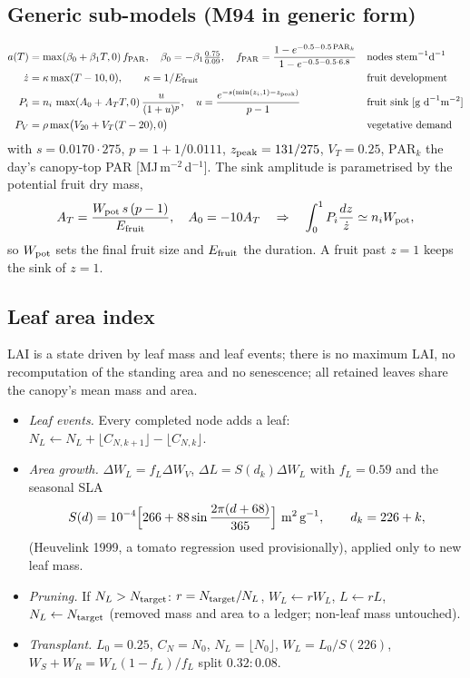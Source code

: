 \documentclass[11pt,a4paper]{article}
\begin{document}
\subsection{Generic sub-models (M94 in generic form)}
\begin{align}
a(T)&=\max(\beta_0+\beta_1T,0)\,f_{\rm PAR},\quad \beta_0=-\beta_1\tfrac{0.75}{0.09},\quad
f_{\rm PAR}=\frac{1-e^{-0.5-0.5\,\mathrm{PAR}_k}}{1-e^{-0.5-0.5\cdot6.8}} &&\text{nodes stem}^{-1}\text{d}^{-1}\\
\dot z&=\kappa\max(T-10,0),\qquad \kappa=1/E_{\rm fruit} &&\text{fruit development}\\
P_i&=n_i\,\max(A_0+A_TT,0)\,\frac{u}{(1+u)^p},\quad u=\frac{e^{-s(\min(z_i,1)-z_{\rm peak})}}{p-1} &&\text{fruit sink [g d}^{-1}\text{m}^{-2}]\\
P_V&=\rho\max\bigl(V_{20}+V_T(T-20),0\bigr) &&\text{vegetative demand}
\end{align}
with $s=0.0170\cdot275$, $p=1+1/0.0111$, $z_{\rm peak}=131/275$, $V_T=0.25$, $\mathrm{PAR}_k$ the day's canopy-top PAR
[MJ\,m$^{-2}$\,d$^{-1}$]. The sink amplitude is parametrised by the potential fruit dry mass,
\begin{equation}
A_T=\frac{W_{\rm pot}\,s\,(p-1)}{E_{\rm fruit}},\quad A_0=-10A_T\quad\Rightarrow\quad\int_0^1P_i\frac{dz}{\dot z}\simeq n_iW_{\rm pot},
\end{equation}
so $W_{\rm pot}$ sets the final fruit size and $E_{\rm fruit}$ the duration. A fruit past $z=1$ keeps the sink of $z=1$.

\subsection{Leaf area index}\label{sec:lai}
LAI is a state driven by leaf mass and leaf events; there is no maximum LAI, no recomputation of the standing area and no
senescence; all retained leaves share the canopy's mean mass and area.
\begin{itemize}[nosep]
\item \emph{Leaf events.} Every completed node adds a leaf: $N_L\leftarrow N_L+\lfloor C_{N,k+1}\rfloor-\lfloor C_{N,k}\rfloor$.
\item \emph{Area growth.} $\Delta W_L=f_L\Delta W_V$, $\Delta L=S(d_k)\Delta W_L$ with $f_L=0.59$ and the seasonal SLA
\begin{equation}
S(d)=10^{-4}\Bigl[266+88\sin\frac{2\pi(d+68)}{365}\Bigr]\ \text{m}^2\,\text{g}^{-1},\qquad d_k=226+k,
\end{equation}
(Heuvelink 1999, a tomato regression used provisionally), applied only to new leaf mass.
\item \emph{Pruning.} If $N_L>N_{\rm target}$: $r=N_{\rm target}/N_L$, $W_L\leftarrow rW_L$, $L\leftarrow rL$,
$N_L\leftarrow N_{\rm target}$ (removed mass and area to a ledger; non-leaf mass untouched).
\item \emph{Transplant.} $L_0=0.25$, $C_N=N_0$, $N_L=\lfloor N_0\rfloor$, $W_L=L_0/S(226)$, $W_S+W_R=W_L(1-f_L)/f_L$ split $0.32:0.08$.
\end{itemize}
\end{document}
